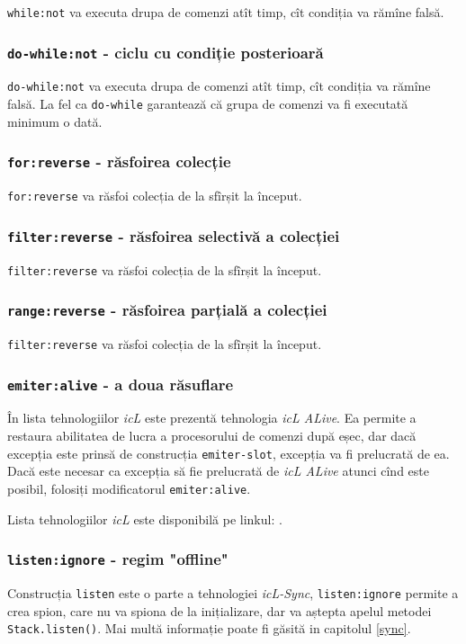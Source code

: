 \texttt{while:not} va executa drupa de comenzi atît timp, cît condiția va rămîne falsă.

\subsubsection{\texttt{do-while:not} - ciclu cu condiție posterioară}

\texttt{do-while:not} va executa drupa de comenzi atît timp, cît condiția va rămîne falsă. La fel ca \texttt{do-while} garantează că grupa de comenzi va fi executată minimum o dată.

\subsubsection{\texttt{for:reverse} - răsfoirea colecție}

\texttt{for:reverse} va răsfoi colecția de la sfîrșit la început.

\subsubsection{\texttt{filter:reverse} - răsfoirea selectivă a colecției}

\texttt{filter:reverse} va răsfoi colecția de la sfîrșit la început.

\subsubsection{\texttt{range:reverse} - răsfoirea parțială a colecției}

\texttt{filter:reverse} va răsfoi colecția de la sfîrșit la început.

\subsubsection{\texttt{emiter:alive} - a doua răsuflare}

În lista tehnologiilor \textit{icL} este prezentă tehnologia \textit{icL ALive}. Ea permite a restaura abilitatea de lucra a procesorului de comenzi după eșec, dar dacă excepția este prinsă de construcția \texttt{emiter-slot}, excepția va fi prelucrată de ea. Dacă este necesar ca excepția să fie prelucrată de \textit{icL ALive} atunci cînd este posibil, folosiți modificatorul \texttt{emiter:alive}.

Lista tehnologiilor \textit{icL} este disponibilă pe linkul: .

\subsubsection{\texttt{listen:ignore} - regim "offline"}

Construcția \texttt{listen} este o parte a tehnologiei \textit{icL-Sync}, \texttt{listen:ignore} permite a crea spion, care nu va spiona de la inițializare, dar va aștepta apelul metodei \texttt{Stack.listen()}. Mai multă informație poate fi găsită in capitolul \ref{sync}.